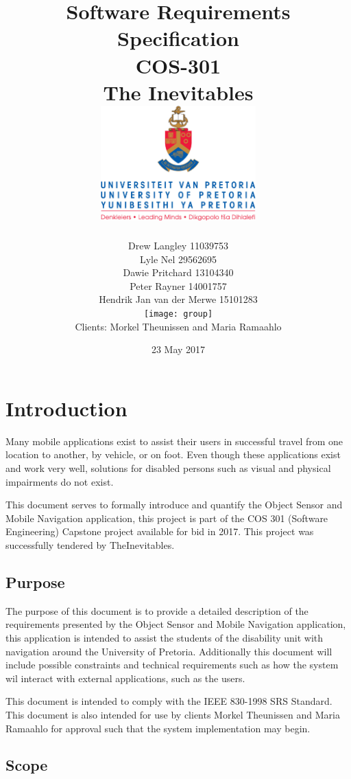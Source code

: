 \documentclass{article}
\title{ Software Requirements Specification \\ COS-301 \\ The Inevitables \\[0.5cm] \includegraphics[width=6cm]{front-page}}
\author{Drew Langley \hfill 11039753 \\ Lyle Nel \hfill 29562695 \\ Dawie Pritchard \hfill 13104340 \\  Peter Rayner \hfill 14001757\\ Hendrik Jan van der Merwe \hfill 15101283 \\ [1cm]\texttt{[image: group]}\\ [1cm] Clients: Morkel Theunissen and Maria Ramaahlo }
\date{23 May 2017}
\begin{document}
\maketitle
\pagebreak
\tableofcontents
\pagebreak


\section{Introduction}
		Many mobile applications exist to assist their users in successful travel from one location to another, by vehicle, or on foot.
		Even though these applications exist and work very well, solutions for disabled persons such as visual and physical impairments do not exist. \par \noindent
		This document serves to formally introduce and quantify the Object Sensor and Mobile Navigation application, this project is part of the COS 301 (Software Engineering) Capstone project available for bid in 2017. This project was successfully tendered by TheInevitables.
	
	\subsection{Purpose}
		The purpose of this document is to provide a detailed description of the requirements presented by the Object Sensor and Mobile Navigation application, this application is intended to assist the students of the disability unit with navigation around the University of Pretoria. Additionally this document will include possible constraints and technical requirements such as how the system wil interact with external applications, such as the users. \par
		This document is intended to comply with the IEEE 830-1998 SRS Standard. This document is also intended for use by clients Morkel Theunissen and Maria Ramaahlo for approval such that the system implementation may begin.
		
	\subsection{Scope}
\end{document}

